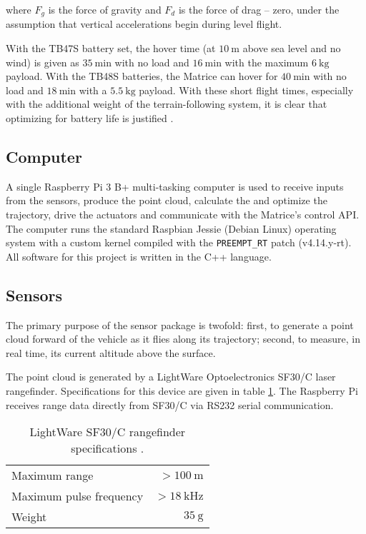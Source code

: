 where $F_g$ is the force of gravity and $F_d$ is the force of drag -- zero, under the assumption that vertical accelerations begin during level flight.

With the TB47S battery set, the hover time (at $\SI{10}{\metre}$ above sea level and no wind) is given as $\SI{35}{\minute}$ with no load and $\SI{16}{\minute}$ with the maximum $\SI{6}{\kg}$ payload. With the TB48S batteries, the Matrice can hover for $\SI{40}{\minute}$ with no load and $\SI{18}{\minute}$ with a $\SI{5.5}{\kg}$ payload. With these short flight times, especially with the additional weight of the terrain-following system, it is clear that optimizing for battery life is justified \cite{DJI2017}.

\subsection{Computer}

A single Raspberry Pi 3 B+ multi-tasking computer is used to receive inputs from the sensors, produce the point cloud, calculate the and optimize the trajectory, drive the actuators and communicate with the Matrice's control API. The computer runs the standard Raspbian Jessie (Debian Linux) operating system with a custom kernel compiled with the \texttt{PREEMPT\_RT} patch (v4.14.y-rt). All software for this project is written in the C++ language.

\subsection{Sensors}

The primary purpose of the sensor package is twofold: first, to generate a point cloud forward of the vehicle as it flies along its trajectory; second, to measure, in real time, its current altitude above the surface. 

The point cloud is generated by a LightWare Optoelectronics SF30/C laser rangefinder. Specifications for this device are given in table \ref{table:lwsf30cspecs}. The Raspberry Pi receives range data directly from SF30/C via RS232 serial communication.

\begin{table}
\begin{center}
\begin{tabular}{l r}
\hline
Maximum range & $> \SI{100}{\metre}$ \\
Maximum pulse frequency & $> \SI{18}{\kHz}$ \\
Weight & $\SI{35}{\g}$ \\
\hline
\end{tabular}
\end{center}
\caption{LightWare SF30/C rangefinder specifications \cite{LightWare2016}.}
\label{table:lwsf30cspecs}
\end{table}

